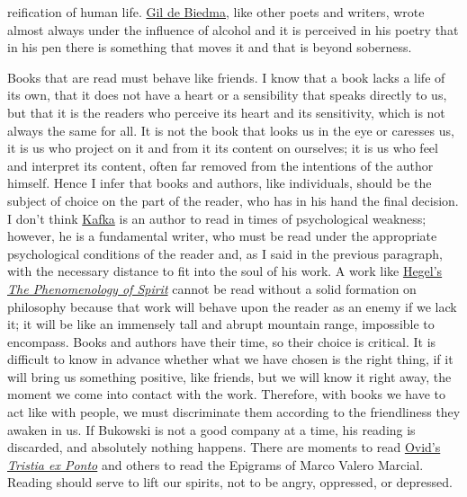 \documentclass[]{book}
\begin{document}
reification of human life. \href{https://en.wikipedia.org/wiki/Jaime_Gil_de_Biedma}{Gil de Biedma}, like other poets and writers, wrote almost always under the influence of alcohol and it is perceived in his poetry that in his pen there is something that moves it and that is beyond soberness.

Books that are read must behave like friends. I know that a book lacks a life of its own, that it does not have a heart or a sensibility that speaks directly to us, but that it is the readers who perceive its heart and its sensitivity, which is not always the same for all. It is not the book that looks us in the eye or caresses us, it is us who project on it and from it its content on ourselves; it is us who feel and interpret its content, often far removed from the intentions of the author himself. Hence I infer that books and authors, like individuals, should be the subject of choice on the part of the reader, who has in his hand the final decision. I don't think \href{https://en.wikipedia.org/wiki/Franz_Kafka}{Kafka} is an author to read in times of psychological weakness; however, he is a fundamental writer, who must be read under the appropriate psychological conditions of the reader and, as I said in the previous paragraph, with the necessary distance to fit into the soul of his work. A work like \href{https://en.wikipedia.org/wiki/Georg_Wilhelm_Friedrich_Hegel}{Hegel's} \href{https://en.wikipedia.org/wiki/The_Phenomenology_of_Spirit}{\emph{The Phenomenology of Spirit}} \citep{hegel1998phenomenology} cannot be read without a solid formation on philosophy because that work will behave upon the reader as an enemy if we lack it; it will be like an immensely tall and abrupt mountain range, impossible to encompass. Books and authors have their time, so their choice is critical. It is difficult to know in advance whether what we have chosen is the right thing, if it will bring us something positive, like friends, but we will know it right away, the moment we come into contact with the work. Therefore, with books we have to act like with people, we must discriminate them according to the friendliness they awaken in us. If Bukowski is not a good company at a time, his reading is discarded, and absolutely nothing happens. There are moments to read \href{https://en.wikipedia.org/wiki/Ovid}{Ovid's} \href{https://en.wikipedia.org/wiki/Tristia}{\emph{Tristia ex Ponto}} \citep{wheeler1924ovid} and others to read the Epigrams of Marco Valero Marcial. Reading should serve to lift our spirits, not to be angry, oppressed, or depressed.
\end{document}
